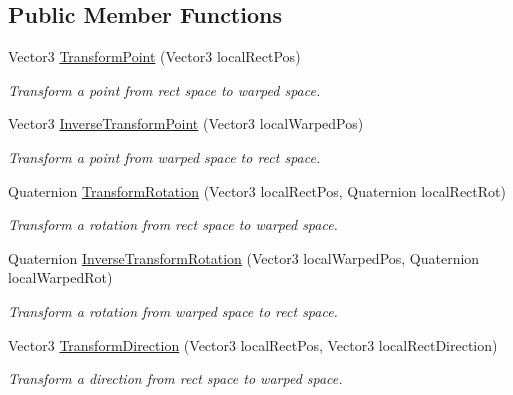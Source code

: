 \subsection*{Public Member Functions}
\begin{DoxyCompactItemize}
\item 
Vector3 \mbox{\hyperlink{class_leap_1_1_unity_1_1_space_1_1_leap_cylindrical_space_1_1_transformer_aa912ab55d4e9a20dcbfaff6717f688f9}{Transform\+Point}} (Vector3 local\+Rect\+Pos)
\begin{DoxyCompactList}\small\item\em Transform a point from rect space to warped space. \end{DoxyCompactList}\item 
Vector3 \mbox{\hyperlink{class_leap_1_1_unity_1_1_space_1_1_leap_cylindrical_space_1_1_transformer_a4005272b32cd3040a830f43ad9e072d9}{Inverse\+Transform\+Point}} (Vector3 local\+Warped\+Pos)
\begin{DoxyCompactList}\small\item\em Transform a point from warped space to rect space. \end{DoxyCompactList}\item 
Quaternion \mbox{\hyperlink{class_leap_1_1_unity_1_1_space_1_1_leap_cylindrical_space_1_1_transformer_afdb282453fb2729b9e8ee426814f6d30}{Transform\+Rotation}} (Vector3 local\+Rect\+Pos, Quaternion local\+Rect\+Rot)
\begin{DoxyCompactList}\small\item\em Transform a rotation from rect space to warped space. \end{DoxyCompactList}\item 
Quaternion \mbox{\hyperlink{class_leap_1_1_unity_1_1_space_1_1_leap_cylindrical_space_1_1_transformer_a679c3020469b4b124056bd8f83c99c26}{Inverse\+Transform\+Rotation}} (Vector3 local\+Warped\+Pos, Quaternion local\+Warped\+Rot)
\begin{DoxyCompactList}\small\item\em Transform a rotation from warped space to rect space. \end{DoxyCompactList}\item 
Vector3 \mbox{\hyperlink{class_leap_1_1_unity_1_1_space_1_1_leap_cylindrical_space_1_1_transformer_a9ee37b1079bb46d1f4ae1e87cb3491f2}{Transform\+Direction}} (Vector3 local\+Rect\+Pos, Vector3 local\+Rect\+Direction)
\begin{DoxyCompactList}\small\item\em Transform a direction from rect space to warped space. \end{DoxyCompactList}\item 

\end{DoxyCompactItemize}

